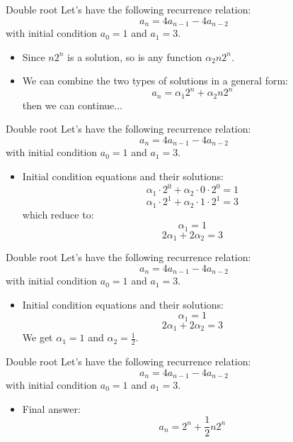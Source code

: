 \documentclass{beamer}
\begin{document}
\begin{frame}{Double root}
    Let's have the following recurrence relation:
        $$ a_n = 4 a_{n-1} - 4 a_{n-2} $$
    with initial condition $a_0 = 1$ and $a_1 = 3$.
    \begin{itemize}
     \item Since $n 2^n$ is a solution, so is any function $\alpha_2 n 2^n$.
     \item We can combine the two types of solutions in a general form:
     $$ a_n = \alpha_1 2^n + \alpha_2 n 2^n $$
     then we can continue...
    \end{itemize}
\end{frame}

\begin{frame}{Double root}
    Let's have the following recurrence relation:
        $$ a_n = 4 a_{n-1} - 4 a_{n-2} $$
    with initial condition $a_0 = 1$ and $a_1 = 3$.
    \begin{itemize}
     \item Initial condition equations and their solutions:
     $$ \alpha_1 \cdot 2^0 + \alpha_2 \cdot 0 \cdot 2^0 = 1 $$
     $$ \alpha_1 \cdot 2^1 + \alpha_2 \cdot 1 \cdot 2^1 = 3 $$
     which reduce to:
     $$ \alpha_1 = 1 $$
     $$  2 \alpha_1 + 2 \alpha_2 = 3 $$
    \end{itemize}
\end{frame}

\begin{frame}{Double root}
    Let's have the following recurrence relation:
        $$ a_n = 4 a_{n-1} - 4 a_{n-2} $$
    with initial condition $a_0 = 1$ and $a_1 = 3$.
    \begin{itemize}
     \item Initial condition equations and their solutions:
     $$ \alpha_1 = 1 $$
     $$  2 \alpha_1 + 2 \alpha_2 = 3 $$
     We get $\alpha_1 = 1$ and $\alpha_2 = \frac{1}{2}$.
    \end{itemize}
\end{frame}

\begin{frame}{Double root}
    Let's have the following recurrence relation:
        $$ a_n = 4 a_{n-1} - 4 a_{n-2} $$
    with initial condition $a_0 = 1$ and $a_1 = 3$.
    \begin{itemize}
     \item Final answer:
     $$ a_n = 2^n + \frac{1}{2} n 2^n $$
    \end{itemize}
\end{frame}
\end{document}
